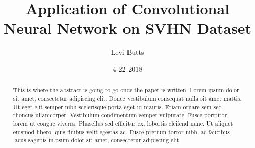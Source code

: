 \documentclass{article}
\title{Application of Convolutional Neural Network on SVHN Dataset}
\date{4-22-2018}
\author{Levi Butts}
\begin{document}
	\maketitle
	\begin{abstract}
		This is  where the abstract is going to go once the paper is written. Lorem ipsum dolor sit amet, consectetur adipiscing elit. Donec vestibulum consequat nulla sit amet mattis. Ut eget elit semper nibh scelerisque porta eget id mauris. Etiam ornare sem sed rhoncus ullamcorper. Vestibulum condimentum semper vulputate. Fusce porttitor lorem ut congue viverra. Phasellus sed efficitur ex, lobortis eleifend nunc. Ut aliquet euismod libero, quis finibus velit egestas ac. Fusce pretium tortor nibh, ac faucibus lacus sagittis in.psum dolor sit amet, consectetur adipiscing elit.
	\end{abstract}
	\twocolumn
	
\end{document}
